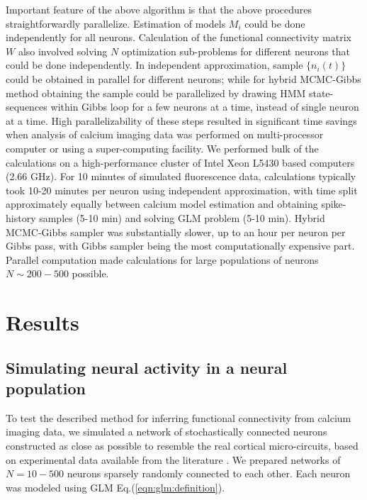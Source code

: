 \documentclass[amsmath,amssymb]{revtex4}
\begin{document}
Important feature of the above algorithm is that the above procedures straightforwardly parallelize. Estimation of models $M_i$ could be done independently for all neurons. Calculation of the functional connectivity matrix $W$ also involved solving $N$ optimization sub-problems for different neurons that could be done independently. In independent approximation, sample $\{ n_i(t)\}$ could be obtained in parallel for different neurons; while for hybrid MCMC-Gibbs method obtaining the sample could be parallelized by drawing HMM state-sequences within Gibbs loop for a few neurons at a time, instead of single neuron at a time. High parallelizability of these steps resulted in significant time savings when analysis of calcium imaging data was performed on multi-processor computer or using a super-computing facility.
We performed bulk of the calculations on a high-performance cluster of Intel Xeon L5430 based computers (2.66 GHz). For 10 minutes of simulated fluorescence data, calculations typically took 10-20 minutes per neuron using independent approximation, with time split approximately equally between calcium model estimation and obtaining spike-history samples (5-10 min) and solving GLM problem (5-10 min). Hybrid MCMC-Gibbs sampler was substantially slower, up to an hour per neuron per Gibbs pass, with Gibbs sampler being the most computationally expensive part. Parallel computation made calculations for large populations of neurons $N\sim 200-500$ possible.


\section{\label{results}Results}
\subsection{\label{sec:results:simulations}Simulating neural activity in a neural population}
To test the described method for inferring functional connectivity from calcium imaging data, we simulated a network of stochastically connected neurons constructed as close as possible to resemble the real cortical micro-circuits, based on experimental data available from the literature \cite{Braitenberg1998,Urquijo2000,Lefort2009,Sayer1990}.
We prepared networks of $N=10-500$ neurons sparsely randomly connected to each other. Each neuron was modeled using GLM Eq.(\ref{eqn:glm:definition}).
\end{document}
